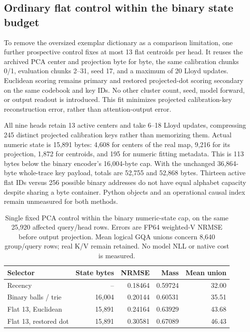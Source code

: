 \documentclass[11pt]{article}
\begin{document}
\subsection{Ordinary flat control within the binary state budget}

To remove the oversized exemplar dictionary as a comparison limitation, one
further prospective control fixes at most 13 flat centroids per head. It reuses
the archived PCA center and projection byte for byte, the same calibration
chunks 0/1, evaluation chunks 2--31, seed 17, and a maximum of 20 Lloyd updates.
Euclidean scoring remains primary and restored projected-dot scoring secondary
on the same codebook and key IDs. No other cluster count, seed, model forward,
or output readout is introduced. This fit minimizes projected calibration-key
reconstruction error, rather than attention-output error.

All nine heads retain 13 active centers and take 6--18 Lloyd updates, compressing
245 distinct projected calibration keys rather than memorizing them. Actual
numeric state is 15,891 bytes: 4,608 for centers of the real map, 9,216 for its
projection, 1,872 for centroids, and 195 for numeric fitting metadata. This is
113 bytes below the binary encoder's 16,004-byte cap. With the unchanged
36,864-byte whole-trace key payload, totals are 52,755 and 52,868 bytes.
Thirteen active flat IDs versus 256 possible binary addresses do not have equal
alphabet capacity despite sharing a byte container. Python objects and an
operational causal index remain unmeasured for both methods.

\begin{table}[htbp]
\centering\small
\caption{Single fixed PCA control within the binary numeric-state cap,
on the same 25,920 affected query/head rows. Errors are FP64 weighted-V NRMSE
before output projection. Mean logical GQA unions concern 8,640 group/query rows;
real K/V remain retained. No model NLL or native cost is measured.}
\begin{tabular}{lrrrr}
\toprule
Selector & State bytes & NRMSE & Mass & Mean union\\
\midrule
Recency & -- & 0.18464 & 0.59724 & 32.00\\
Binary balls / trie & 16,004 & 0.20144 & 0.60531 & 35.51\\
Flat 13, Euclidean & 15,891 & 0.24164 & 0.63929 & 43.68\\
Flat 13, restored dot & 15,891 & 0.30581 & 0.67089 & 46.43\\
\bottomrule
\end{tabular}
\label{tab:flat-state-cap}
\end{table}
\end{document}
